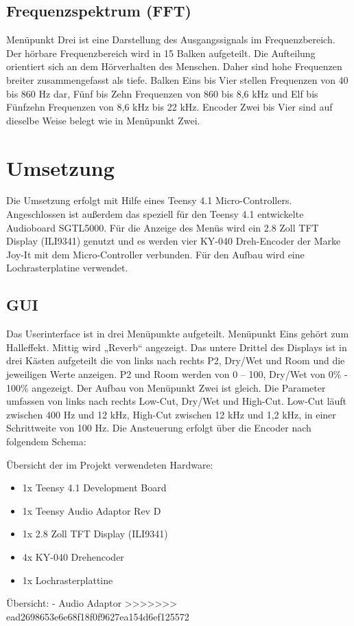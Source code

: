 \documentclass[12pt]{article}
\begin{document}
\subsection{Frequenzspektrum (FFT)}
Menüpunkt Drei ist eine Darstellung des Ausgangssignals im Frequenzbereich. 
Der hörbare Frequenzbereich wird in 15 Balken aufgeteilt. Die Aufteilung orientiert sich an dem Hörverhalten des Menschen. 
Daher sind hohe Frequenzen breiter zusammengefasst als tiefe. 
Balken Eins bis Vier stellen Frequenzen von 40 bis 860 Hz dar, Fünf bis Zehn Frequenzen von 860 bis 8,6 kHz und Elf bis Fünfzehn Frequenzen von 8,6 kHz bis 22 kHz.
Encoder Zwei bis Vier sind auf dieselbe Weise belegt wie in Menüpunkt Zwei.
\section{Umsetzung}
Die Umsetzung erfolgt mit Hilfe eines Teensy 4.1 Micro-Controllers. 
Angeschlossen ist außerdem das speziell für den Teensy 4.1 entwickelte Audioboard SGTL5000. 
Für die Anzeige des Menüs wird ein 2.8 Zoll TFT Display (ILI9341) genutzt und es werden vier KY-040 Dreh-Encoder der Marke Joy-It mit dem Micro-Controller verbunden. 
Für den Aufbau wird eine Lochrasterplatine verwendet.
\subsection{GUI}
Das Userinterface ist in drei Menüpunkte aufgeteilt. Menüpunkt Eins gehört zum Halleffekt. Mittig wird „Reverb“ angezeigt. 
Das untere Drittel des Displays ist in drei Kästen aufgeteilt die von links nach rechts P2, Dry/Wet und Room und die jeweiligen Werte anzeigen. 
P2 und Room werden von 0 – 100, Dry/Wet von 0\% - 100\% angezeigt. Der Aufbau von Menüpunkt Zwei ist gleich. 
Die Parameter umfassen von links nach rechts Low-Cut, Dry/Wet und High-Cut. Low-Cut läuft zwischen 400 Hz und 12 kHz, High-Cut zwischen 12 kHz und 1,2 kHz, in einer Schrittweite von 100 Hz. 
Die Ansteuerung erfolgt über die Encoder nach folgendem Schema:



Übersicht der im Projekt verwendeten Hardware:
\begin{itemize}
    \item 1x Teensy 4.1 Development Board
    \item 1x Teensy Audio Adaptor Rev D
    \item 1x 2.8 Zoll TFT Display (ILI9341)
    \item 4x KY-040 Drehencoder
    \item 1x Lochrasterplattine
\end{itemize}
Übersicht:
- Audio Adaptor 
>>>>>>> ead2698653e6e68f18f0f9627ea154d6ef125572
\newpage
\end{document}

